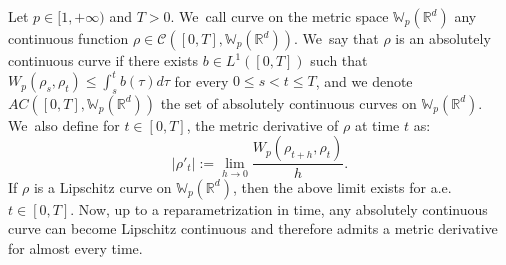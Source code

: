 \documentclass[11pt]{article}
\numberwithin{equation}{section}
\def\RR{\mathbb{R}}
\def\WW{\mathbb{W}}
\def\calC{{\mathcal C}}
\theoremstyle{plain}
\theoremstyle{definition}
\begin{document}
Let $p \in [1,+\infty)$ and $T > 0$. We~call curve on the metric space $\WW_p(\RR^d)$ any continuous function $\rho \in \calC([0,T], \WW_p(\RR^d))$. We~say that $\rho$ is an absolutely continuous curve if there exists $b \in L^1([0,T])$ such that $W_p(\rho_s, \rho_t) \leq \int_s^t b(\tau)d\tau$ for every $0\leq s<t\leq T$, and we denote $AC([0,T], \WW_p(\RR^d))$ the set of absolutely continuous curves on $\WW_p(\RR^d)$. We~also define for $t \in [0,T]$, the metric derivative of $\rho$ at time $t$ as:
\begin{equation*}
|\rho'_t| := \lim_{h \to 0} \frac{W_p(\rho_{t+h},\rho_t)}{h}.
\end{equation*}
If $\rho$ is a Lipschitz curve on $\WW_p(\RR^d)$, then the above limit exists for a.e. $t \in [0,T]$. Now, up to a reparametrization in time, any absolutely continuous curve can become Lipschitz continuous and therefore admits a metric derivative for almost every time.
\end{document}
